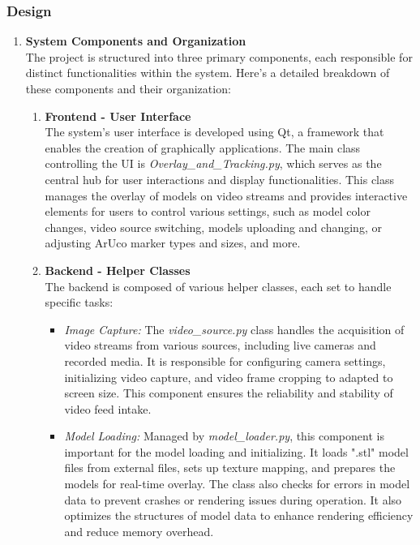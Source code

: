 \documentclass[12pt]{article}
\begin{document}
\subsubsection{Design}
\begin{enumerate}
      \item \textbf{System Components and Organization}
            \\The project is structured into three primary components, each responsible for distinct functionalities within the system.
            Here’s a detailed breakdown of these components and their organization:
            \begin{enumerate}
                  \item \textbf{Frontend - User Interface}
                        \\The system's user interface is developed using Qt, a framework that enables the creation of graphically applications.
                        The main class controlling the UI is \emph{Overlay\_and\_Tracking.py}, which serves as the central hub for user interactions and display functionalities. 
                        This class manages the overlay of models on video streams and provides interactive elements for users to control various settings, such as model color changes,
                        video source switching, models uploading and changing, or adjusting ArUco marker types and sizes, and more.
                  \item \textbf{Backend - Helper Classes}
                        \\The backend is composed of various helper classes, each set to handle specific tasks:
                        \begin{itemize}
                              \item \textit{Image Capture:} The \emph{video\_source.py} class handles the acquisition of video streams from various sources, 
                              including live cameras and recorded media. It is responsible for configuring camera settings, initializing video capture, and video frame cropping to adapted to screen size. This component ensures the reliability and stability of video feed intake.
                          
                              \item \textit{Model Loading:} Managed by \emph{model\_loader.py}, this component is important for the model loading and initializing. It loads ".stl" model files from external files, sets up texture mapping, and prepares the models for real-time overlay. The class also checks for errors in model data to prevent crashes or rendering issues during operation. It also optimizes the structures of model data to enhance rendering efficiency and reduce memory overhead.
                          

\end{itemize}
\end{enumerate}
\end{enumerate}
\end{document}
